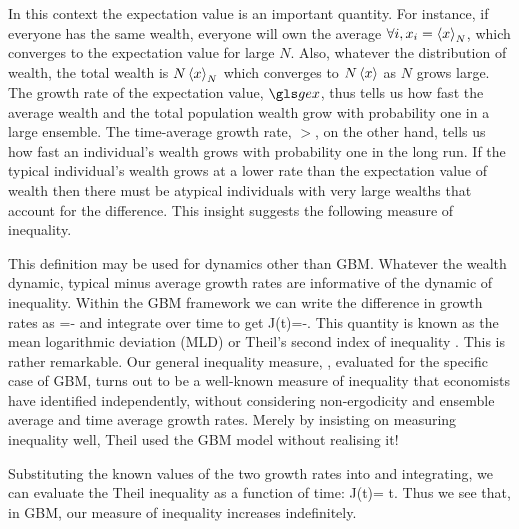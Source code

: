 In this context the expectation value is an important quantity. 
For instance, if everyone has the same wealth, everyone will own the average $\forall i, x_i=\left\langle x \right\rangle_N$,
which converges to the expectation value for large $N$. Also, whatever the distribution 
of wealth, the total wealth is $N\left\langle x \right\rangle_N$ which converges to $N\left\langle x \right\rangle$ as $N$ grows large. The growth 
rate of the expectation value, $\gex$, thus tells us how fast the average wealth and the 
total population wealth grow with probability one in a large ensemble. The time-average growth rate, $\gt$, on the other hand, tells us how fast an individual's wealth grows with probability one in 
the long run. If the typical individual's wealth grows at a lower rate than the 
expectation value of wealth then there must be atypical individuals with very large 
wealths that account for the difference. This insight suggests the following measure of 
inequality.


This definition may be used for dynamics other than
GBM. Whatever the wealth dynamic, typical minus average growth rates are informative of the
dynamic of inequality. Within the GBM framework we can write the difference in growth rates as 
\be
{}=-
\ee
and integrate over time to get
\be
J(t)=\ln {}-.
\ee
This quantity is known as the mean logarithmic deviation (MLD) or Theil's second index of inequality \cite{Theil1967}. 
This is rather remarkable. Our general inequality measure, , evaluated 
for the specific case of GBM, turns out to be a well-known measure of inequality that 
economists have identified independently, without considering non-ergodicity and ensemble 
average and time average growth rates. Merely by insisting on measuring inequality well,
Theil used the GBM model without realising it!

Substituting the known values of the two growth rates into  and integrating, we can evaluate the Theil inequality as a function of time:
\be
J(t)= t.
\ee
Thus we see that, in GBM, our measure of inequality increases indefinitely.

